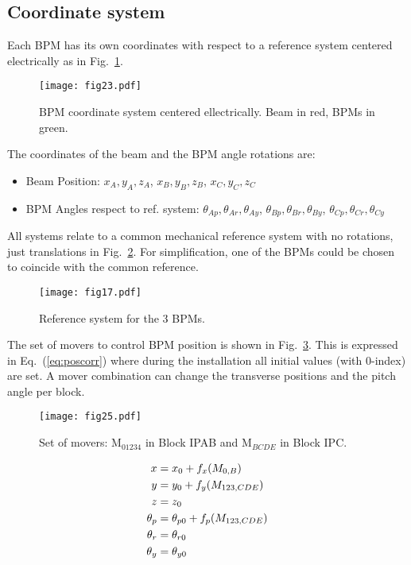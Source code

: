 \subsection{Coordinate system}\par
Each BPM has its own coordinates with respect to a reference system centered electrically as in Fig.~\ref{f:BPMcoordinate}.\par
\begin{figure}[h]
\centering
  \texttt{[image: fig23.pdf]}\caption{BPM coordinate system centered ellectrically. Beam in red, BPMs in green.}\label{f:BPMcoordinate}
\end{figure}
The coordinates of the beam and the BPM angle rotations are:
\begin{itemize}
 \item Beam Position: $x_A,y_A,z_A$, $x_B,y_B,z_B$, $x_C,y_C,z_C$
 \item BPM Angles respect to ref. system:  $\theta_{Ap},\theta_{Ar},\theta_{Ay}$, $\theta_{Bp},\theta_{Br},\theta_{By}$, $\theta_{Cp},\theta_{Cr},\theta_{Cy}$
\end{itemize}
All systems relate to a common mechanical reference system with no rotations, just translations in Fig.~\ref{f:ref3BPMs}. For simplification, one of the BPMs could be chosen to coincide with the common reference.\par
\begin{figure}[h]
\centering
\texttt{[image: fig17.pdf]}\caption{Reference system for the 3 BPMs.}\label{f:ref3BPMs}
\end{figure}
The set of movers to control BPM position is shown in Fig.~\ref{f:moverss}. This is expressed in Eq.~(\ref{eq:poscorr}) where during the installation all initial values (with 0-index) are set. A mover combination can change the transverse positions and the pitch angle per block.\par
\begin{figure}[h]
\centering
\texttt{[image: fig25.pdf]}\caption{Set of movers: M$_{01234}$ in Block IPAB and M$_{BCDE}$ in Block IPC.}\label{f:moverss}
\end{figure}
\begin{align}
 x &= x_0+f_x(M_{0,B})\label{eq:poscorr}\\
 y &= y_0+f_y(M_{123,CDE})\notag\\
 z &= z_0\notag\\
 \theta_p &= \theta_{p0}+f_p(M_{123,CDE})\notag\\
 \theta_r &= \theta_{r0}\notag\\
 \theta_y &= \theta_{y0}\notag
\end{align}\par

